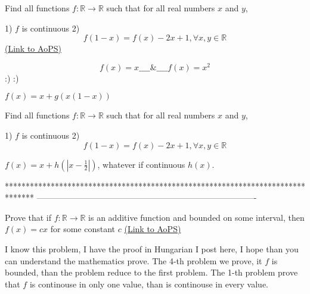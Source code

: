 \begin{problem}
	Find all functions $f:\mathbb R\to\mathbb R$ such that for all real numbers $x$ and $y$,

1) $f$ is continuous
2) $$f(1-x) = f(x)-2x+1,             
 \forall x,y \in \mathbb R$$
	\flushright \href{https://artofproblemsolving.com/community/c6h1579631}{(Link to AoPS)}
\end{problem}



\begin{solution}
	$$\boxed{f(x)=x}\_\_\_\_\&\_\_\_\_\boxed{f(x)=x^2}$$ :) :)
\end{solution}



\begin{solution}
	$f(x)=x+g(x(1-x))$
\end{solution}



\begin{solution}
	\begin{tcolorbox}Find all functions $f:\mathbb R\to\mathbb R$ such that for all real numbers $x$ and $y$,

1) $f$ is continuous
2) $$f(1-x) = f(x)-2x+1,             
 \forall x,y \in \mathbb R$$\end{tcolorbox}
$f(x)=x+h(|x-\frac 12|)$, whatever if continuous $h(x)$.

\end{solution}
*******************************************************************************
-------------------------------------------------------------------------------

\begin{problem}
	Prove that if $f:\mathbb{R}\to \mathbb{R}$ is an additive function and bounded on some interval, then $f(x)=cx$ for some constant $c$
	\flushright \href{https://artofproblemsolving.com/community/c6h1583638}{(Link to AoPS)}
\end{problem}



\begin{solution}
	I know this problem, I have the proof in Hungarian I post here, I hope than you can understand the mathematics prove.
The 4-th problem we prove, it $f$ is bounded, than the problem reduce to the first problem.
The 1-th problem prove that $f$ is continouse in only one value, than is continouse in every value.
\end{solution}



